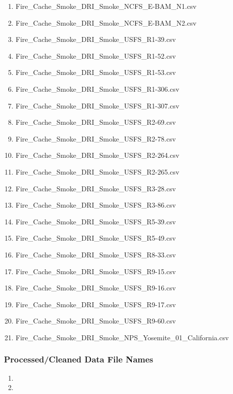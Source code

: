 \begin{enumerate}[nolistsep]
\item Fire\_Cache\_Smoke\_DRI\_Smoke\_NCFS\_E-BAM\_N1.csv
\item Fire\_Cache\_Smoke\_DRI\_Smoke\_NCFS\_E-BAM\_N2.csv
\item Fire\_Cache\_Smoke\_DRI\_Smoke\_USFS\_R1-39.csv
\item Fire\_Cache\_Smoke\_DRI\_Smoke\_USFS\_R1-52.csv
\item Fire\_Cache\_Smoke\_DRI\_Smoke\_USFS\_R1-53.csv
\item Fire\_Cache\_Smoke\_DRI\_Smoke\_USFS\_R1-306.csv
\item Fire\_Cache\_Smoke\_DRI\_Smoke\_USFS\_R1-307.csv
\item Fire\_Cache\_Smoke\_DRI\_Smoke\_USFS\_R2-69.csv
\item Fire\_Cache\_Smoke\_DRI\_Smoke\_USFS\_R2-78.csv
\item Fire\_Cache\_Smoke\_DRI\_Smoke\_USFS\_R2-264.csv
\item Fire\_Cache\_Smoke\_DRI\_Smoke\_USFS\_R2-265.csv
\item Fire\_Cache\_Smoke\_DRI\_Smoke\_USFS\_R3-28.csv
\item Fire\_Cache\_Smoke\_DRI\_Smoke\_USFS\_R3-86.csv
\item Fire\_Cache\_Smoke\_DRI\_Smoke\_USFS\_R5-39.csv
\item Fire\_Cache\_Smoke\_DRI\_Smoke\_USFS\_R5-49.csv
\item Fire\_Cache\_Smoke\_DRI\_Smoke\_USFS\_R8-33.csv
\item Fire\_Cache\_Smoke\_DRI\_Smoke\_USFS\_R9-15.csv
\item Fire\_Cache\_Smoke\_DRI\_Smoke\_USFS\_R9-16.csv
\item Fire\_Cache\_Smoke\_DRI\_Smoke\_USFS\_R9-17.csv
\item Fire\_Cache\_Smoke\_DRI\_Smoke\_USFS\_R9-60.csv
\item Fire\_Cache\_Smoke\_DRI\_Smoke\_NPS\_Yosemite_01_California.csv

\end{enumerate}

\subsubsection*{Processed/Cleaned Data File Names}

\begin{enumerate}
\item 
\item
\end{enumerate}

